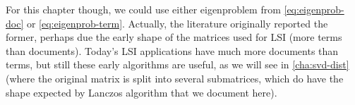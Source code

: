 For this chapter though, we could use either eigenproblem from
\cref{eq:eigenprob-doc} or \cref{eq:eigenprob-term}. Actually, the literature
originally reported the former, perhaps due the early shape of the
matrices used for LSI (more terms than documents). Today's LSI
applications have much more documents than terms, but still these
early algorithms are useful, as we will see in \cref{cha:svd-dist}
(where the original matrix is split into several submatrices, which do
have the shape expected by Lanczos algorithm that we document here).

